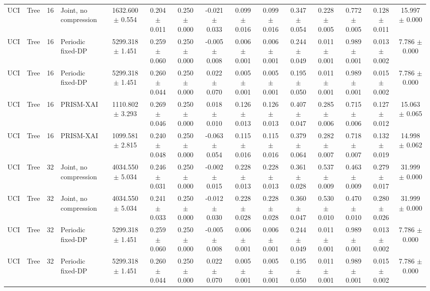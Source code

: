 \begin{table}[t]
\begin{tabular}{llllccccccccccc}
UCI & Tree & 16 & Joint, no compression & 1632.600 $\pm$ 0.554 & 0.204 $\pm$ 0.011 & 0.250 $\pm$ 0.000 & -0.021 $\pm$ 0.033 & 0.099 $\pm$ 0.016 & 0.099 $\pm$ 0.016 & 0.347 $\pm$ 0.054 & 0.228 $\pm$ 0.005 & 0.772 $\pm$ 0.005 & 0.128 $\pm$ 0.011 & 15.997 $\pm$ 0.000 \\
UCI & Tree & 16 & Periodic fixed-DP & 5299.318 $\pm$ 1.451 & 0.259 $\pm$ 0.060 & 0.250 $\pm$ 0.000 & -0.005 $\pm$ 0.008 & 0.006 $\pm$ 0.001 & 0.006 $\pm$ 0.001 & 0.244 $\pm$ 0.049 & 0.011 $\pm$ 0.001 & 0.989 $\pm$ 0.001 & 0.013 $\pm$ 0.002 & 7.786 $\pm$ 0.000 \\
UCI & Tree & 16 & Periodic fixed-DP & 5299.318 $\pm$ 1.451 & 0.260 $\pm$ 0.044 & 0.250 $\pm$ 0.000 & 0.022 $\pm$ 0.070 & 0.005 $\pm$ 0.001 & 0.005 $\pm$ 0.001 & 0.195 $\pm$ 0.050 & 0.011 $\pm$ 0.001 & 0.989 $\pm$ 0.001 & 0.015 $\pm$ 0.002 & 7.786 $\pm$ 0.000 \\
UCI & Tree & 16 & PRISM-XAI & 1110.802 $\pm$ 3.293 & 0.269 $\pm$ 0.046 & 0.250 $\pm$ 0.000 & 0.018 $\pm$ 0.010 & 0.126 $\pm$ 0.013 & 0.126 $\pm$ 0.013 & 0.407 $\pm$ 0.047 & 0.285 $\pm$ 0.006 & 0.715 $\pm$ 0.006 & 0.127 $\pm$ 0.012 & 15.063 $\pm$ 0.065 \\
UCI & Tree & 16 & PRISM-XAI & 1099.581 $\pm$ 2.815 & 0.240 $\pm$ 0.048 & 0.250 $\pm$ 0.000 & -0.063 $\pm$ 0.054 & 0.115 $\pm$ 0.016 & 0.115 $\pm$ 0.016 & 0.379 $\pm$ 0.064 & 0.282 $\pm$ 0.007 & 0.718 $\pm$ 0.007 & 0.132 $\pm$ 0.019 & 14.998 $\pm$ 0.062 \\
UCI & Tree & 32 & Joint, no compression & 4034.550 $\pm$ 5.034 & 0.246 $\pm$ 0.031 & 0.250 $\pm$ 0.000 & -0.002 $\pm$ 0.015 & 0.228 $\pm$ 0.013 & 0.228 $\pm$ 0.013 & 0.361 $\pm$ 0.028 & 0.537 $\pm$ 0.009 & 0.463 $\pm$ 0.009 & 0.279 $\pm$ 0.017 & 31.999 $\pm$ 0.000 \\
UCI & Tree & 32 & Joint, no compression & 4034.550 $\pm$ 5.034 & 0.241 $\pm$ 0.033 & 0.250 $\pm$ 0.000 & -0.012 $\pm$ 0.030 & 0.228 $\pm$ 0.028 & 0.228 $\pm$ 0.028 & 0.360 $\pm$ 0.047 & 0.530 $\pm$ 0.010 & 0.470 $\pm$ 0.010 & 0.280 $\pm$ 0.026 & 31.999 $\pm$ 0.000 \\
UCI & Tree & 32 & Periodic fixed-DP & 5299.318 $\pm$ 1.451 & 0.259 $\pm$ 0.060 & 0.250 $\pm$ 0.000 & -0.005 $\pm$ 0.008 & 0.006 $\pm$ 0.001 & 0.006 $\pm$ 0.001 & 0.244 $\pm$ 0.049 & 0.011 $\pm$ 0.001 & 0.989 $\pm$ 0.001 & 0.013 $\pm$ 0.002 & 7.786 $\pm$ 0.000 \\
UCI & Tree & 32 & Periodic fixed-DP & 5299.318 $\pm$ 1.451 & 0.260 $\pm$ 0.044 & 0.250 $\pm$ 0.000 & 0.022 $\pm$ 0.070 & 0.005 $\pm$ 0.001 & 0.005 $\pm$ 0.001 & 0.195 $\pm$ 0.050 & 0.011 $\pm$ 0.001 & 0.989 $\pm$ 0.001 & 0.015 $\pm$ 0.002 & 7.786 $\pm$ 0.000 \\

\end{tabular}
\end{table}

